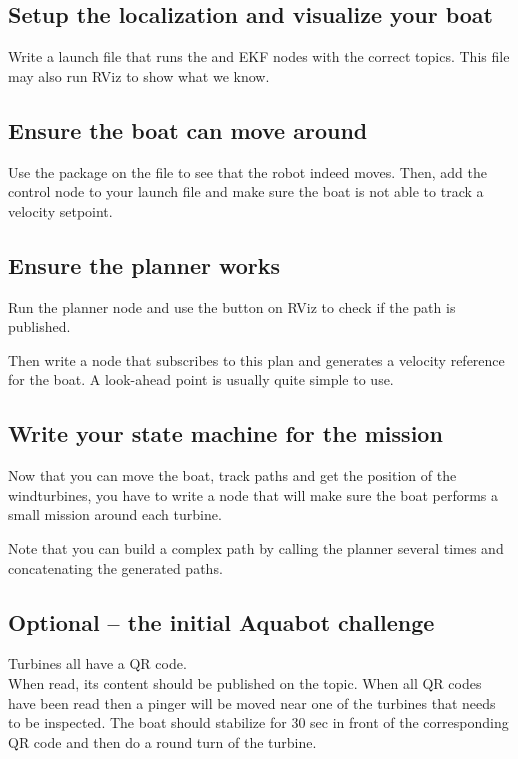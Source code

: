 \documentclass{ecnreport}
\begin{document}
\subsection{Setup the localization and visualize your boat}

Write a launch file that runs the  and EKF nodes with the correct topics. This file may also run RViz to show what we know.

\subsection{Ensure the boat can move around}

Use the  package on the  file to see that the robot indeed moves.
Then, add the control node to your launch file and make sure the boat is not able to track a velocity setpoint.

\subsection{Ensure the planner works}

Run the planner node and use the  button on RViz to check if the path is published.

Then write a node that subscribes to this plan and generates a velocity reference for the boat. A look-ahead point is usually quite simple to use.

\subsection{Write your state machine for the mission}

Now that you can move the boat, track paths and get the position of the windturbines, you have to write a node that will make sure the boat performs a small mission around each turbine.

Note that you can build a complex path by calling the planner several times and concatenating the generated paths.

\subsection{Optional -- the initial Aquabot challenge}

  Turbines all have a QR code. \\
  When read, its content should be published on the {\footnotesize {}} topic. When all QR codes have been read then a pinger will be moved near one of the turbines that needs to be inspected. The boat should stabilize for 30 sec in
front of the corresponding QR code and then do a round turn of the turbine.


  
\end{document}
